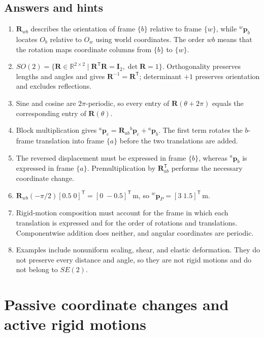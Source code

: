 \documentclass[
  australian,
  12pt,
  letterpaper,
  DIV=11,
  numbers=noendperiod,
  twoside]{scrreprt}
\providecommand{\tightlist}{%
  \setlength{\itemsep}{0pt}\setlength{\parskip}{0pt}}
\begin{document}
\subsection*{Answers and hints}\label{answers-and-hints-10}

\begin{enumerate}
\def\labelenumi{\arabic{enumi}.}
\tightlist
\item
  \(\mathbf R_{wb}\) describes the orientation of frame \(\{b\}\)
  relative to frame \(\{w\}\), while \({}^{w}\mathbf p_b\) locates
  \(O_b\) relative to \(O_w\) using world coordinates. The order \(wb\)
  means that the rotation maps coordinate columns from \(\{b\}\) to
  \(\{w\}\).
\item
  \(SO(2)=\{\mathbf R\in\mathbb R^{2\times2}\mid\mathbf R^\mathsf T\mathbf R=\mathbf I_2,\det\mathbf R=1\}\).
  Orthogonality preserves lengths and angles and gives
  \(\mathbf R^{-1}=\mathbf R^\mathsf T\); determinant \(+1\) preserves
  orientation and excludes reflections.
\item
  Sine and cosine are \(2\pi\)-periodic, so every entry of
  \(\mathbf R(\theta+2\pi)\) equals the corresponding entry of
  \(\mathbf R(\theta)\).
\item
  Block multiplication gives
  \({}^{a}\mathbf p_c=\mathbf R_{ab}{}^{b}\mathbf p_c+{}^{a}\mathbf p_b\).
  The first term rotates the \(b\)-frame translation into frame
  \(\{a\}\) before the two translations are added.
\item
  The reversed displacement must be expressed in frame \(\{b\}\),
  whereas \({}^{a}\mathbf p_b\) is expressed in frame \(\{a\}\).
  Premultiplication by \(\mathbf R_{ab}^\mathsf T\) performs the
  necessary coordinate change.
\item
  \(\mathbf R_{wb}(-\pi/2)[0.5\;0]^\mathsf T=[0\;-0.5]^\mathsf T\,\mathrm m\),
  so \({}^{w}\mathbf p_P=[3\;1.5]^\mathsf T\,\mathrm m\).
\item
  Rigid-motion composition must account for the frame in which each
  translation is expressed and for the order of rotations and
  translations. Componentwise addition does neither, and angular
  coordinates are periodic.
\item
  Examples include nonuniform scaling, shear, and elastic deformation.
  They do not preserve every distance and angle, so they are not rigid
  motions and do not belong to \(SE(2)\).
\end{enumerate}

\section{Passive coordinate changes and active rigid
motions}\label{passive-coordinate-changes-and-active-rigid-motions}
\end{document}
